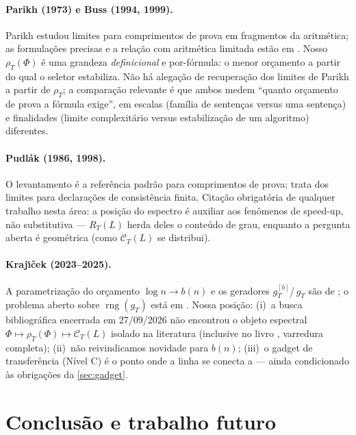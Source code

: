 \documentclass[11pt,a4paper]{article}
\theoremstyle{definition}
\theoremstyle{remark}
\begin{document}
\paragraph{Parikh (1973) e Buss (1994, 1999).}
Parikh \cite{Parikh1973} estudou limites para comprimentos de prova em
fragmentos da aritmética; as formulações precisas e a relação com aritmética
limitada estão em \cite{Buss1994,Buss1999}. Nosso $\rho_T(\Phi)$ é uma
grandeza \emph{definicional} e por-fórmula: o menor orçamento a partir do qual o
seletor estabiliza. Não há alegação de recuperação dos limites de Parikh a
partir de $\rho_T$; a comparação relevante é que ambos medem ``quanto orçamento
de prova a fórmula exige'', em escalas (família de sentenças versus uma sentença)
e finalidades (limite complexitário versus estabilização de um algoritmo)
diferentes.

\paragraph{Pudlák (1986, 1998).}
O levantamento \cite{Pudlak1998} é a referência padrão para comprimentos de
prova; \cite{Pudlak1986} trata dos limites para declarações de consistência
finita. Citação obrigatória de qualquer trabalho nesta área: a posição do
espectro é auxiliar aos fenômenos de speed-up, não substitutiva —
$R_T(L)$ herda deles o conteúdo de grau, enquanto a pergunta aberta é
geométrica (como $\mathcal{C}_T(L)$ se distribui).

\paragraph{Kraj\'{\i}\v{c}ek (2023--2025).}
A parametrização do orçamento $\log n \to b(n)$ e os geradores
$g_T^{[b]}$/\,$g_T$ são de \cite{Krajicek2025,Krajicek2025generators}; o
problema aberto sobre $\operatorname{rng}(g_T)$ está em
\cite{Krajicek2023ECCC}. Nossa posição: (i)~a busca bibliográfica encerrada em
27/09/2026 não encontrou o objeto espectral $\Phi \mapsto \rho_T(\Phi)
\mapsto \mathcal{C}_T(L)$ isolado na literatura (inclusive no livro
\cite{Krajicek2025generators}, varredura completa); (ii)~não reivindicamos
novidade para $b(n)$; (iii)~o gadget de transferência (Nível C) é o ponto onde
a linha se conecta a \cite{Krajicek2025} — ainda condicionado às obrigações da
\cref{sec:gadget}.

\section{Conclus\~{a}o e trabalho futuro}\label{sec:conclusao}
\end{document}
